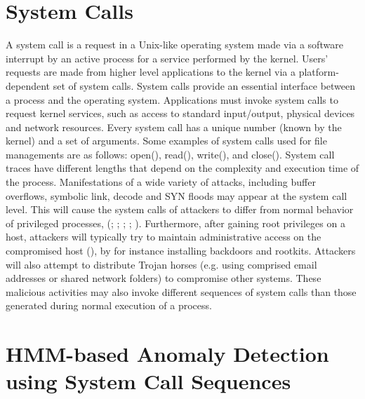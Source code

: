 \section{System Calls}
\label{sec:system-calls}
A system call is a request in a Unix-like operating system made via a software interrupt by an active process for a service performed by the kernel.
Users' requests are made from higher level applications  to the kernel via a platform-dependent set of system calls. System calls provide an essential interface between a process and the operating system. Applications must invoke system calls to request kernel services, such as access to standard input/output, physical devices and network resources. Every system call has a unique number (known by the kernel) and a set of arguments. Some examples of system calls used for file managements are as follows: open(), read(), write(), and close(). System call traces have different lengths that depend on the complexity and execution time of the process.
Manifestations of a wide variety of attacks, including buffer overflows, symbolic link, decode and SYN floods may appear at the system call level. This will cause the system calls of attackers to differ from normal behavior of privileged processes, (\cite{Forrest1996}; \cite{Hofmeyr1998}; \cite{Kosoresow1997}; \cite{Somaayaji2002}; \cite{Warrender1999}).
Furthermore, after gaining root privileges on a host, attackers will typically try to maintain administrative access on the compromised host (\cite{Mitnick2005}), by for instance installing backdoors and rootkits. Attackers will also attempt to distribute Trojan horses (e.g. using comprised email addresses or shared network folders) to compromise
other systems. These malicious activities may also invoke different sequences of system calls than those generated during normal execution of a process.

\section{HMM-based Anomaly Detection using System Call Sequences}
\label{sec:ads-hmm}


